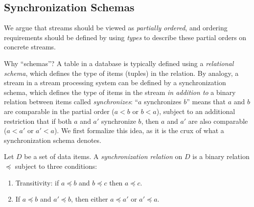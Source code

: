 \subsection{Synchronization Schemas}

We argue that streams should be viewed as \emph{partially ordered},
and ordering requirements should be defined by using
\emph{types} to describe these partial orders on concrete streams.

Why ``schemas''? A table in a database is typically defined using a \emph{relational schema}, which defines the type of items (tuples) in the relation. By analogy, a stream in a stream processing system can be defined by a synchronization schema, which defines the type of items in the stream \emph{in addition to} a binary relation between items called \emph{synchronizes}: ``$a$ synchronizes $b$'' means that $a$ and $b$ are comparable in the partial order ($a < b$ or $b < a$), subject to an additional restriction that if both $a$ and $a'$ synchronize $b$, then $a$ and $a'$ are also comparable ($a < a'$ or $a' < a$).
We first formalize this idea, as it is the crux of what a synchronization schema denotes.

\begin{definition}
Let $D$ be a set of data items. A \emph{synchronization relation} on $D$ is a binary relation $\preceq$ subject to three conditions:
\begin{enumerate}[(1)]
\item Transitivity: if $a \preceq b$ and $b \preceq c$ then $a \preceq c$.
\item If $a \preceq b$ and $a' \preceq b$, then either $a \preceq a'$ or $a' \preceq a$.
\end{enumerate}
\end{definition}
